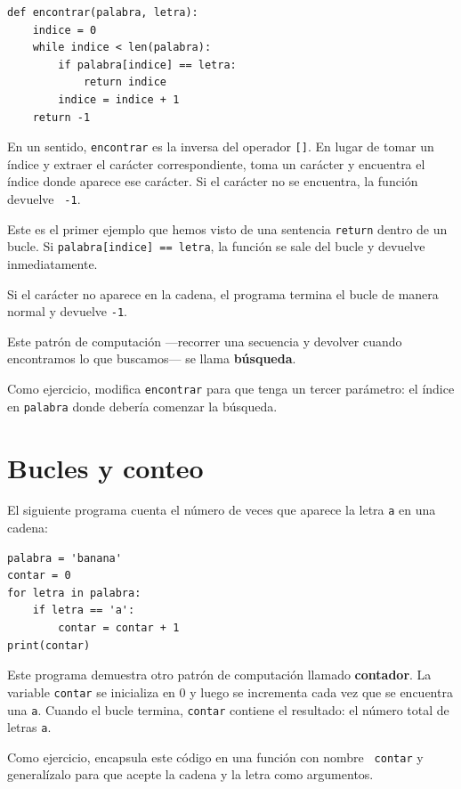 \documentclass[10pt]{book}
\begin{document}
\begin{verbatim}
def encontrar(palabra, letra):
    indice = 0
    while indice < len(palabra):
        if palabra[indice] == letra:
            return indice
        indice = indice + 1
    return -1
\end{verbatim}
%
En un sentido, {\tt encontrar} es la inversa del operador {\tt []}.
En lugar de tomar un índice y extraer el carácter correspondiente,
toma un carácter y encuentra el índice donde aparece ese
carácter.  Si el carácter no se encuentra, la función devuelve {\tt
-1}.

Este es el primer ejemplo que hemos visto de una sentencia {\tt return}
dentro de un bucle.  Si {\tt palabra[indice] == letra}, la función se sale
del bucle y devuelve inmediatamente.

Si el carácter no aparece en la cadena, el programa
termina el bucle de manera normal y devuelve {\tt -1}.

Este patrón de computación ---recorrer una secuencia y devolver
cuando encontramos lo que buscamos--- se llama {\bf búsqueda}.

Como ejercicio, modifica {\tt encontrar} para que tenga un
tercer parámetro: el índice en {\tt palabra} donde debería comenzar la
búsqueda.


\section{Bucles y conteo}
\label{counter}

El siguiente programa cuenta el número de veces que aparece la letra {\tt a}
en una cadena:

\begin{verbatim}
palabra = 'banana'
contar = 0
for letra in palabra:
    if letra == 'a':
        contar = contar + 1
print(contar)
\end{verbatim}
%
Este programa demuestra otro patrón de computación llamado {\bf
contador}.  La variable {\tt contar} se inicializa en 0 y luego
se incrementa cada vez que se encuentra una {\tt a}.
Cuando el bucle termina, {\tt contar}
contiene el resultado: el número total de letras {\tt a}.

Como ejercicio, encapsula este código en una función con nombre {\tt
contar} y generalízalo para que acepte la cadena y la
letra como argumentos.
\end{document}
